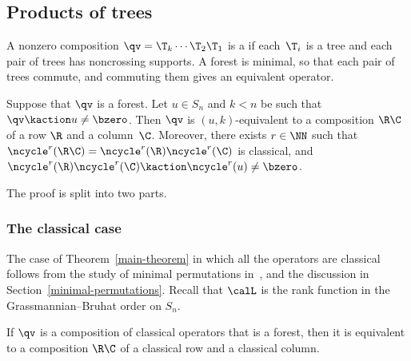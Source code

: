 \subsection{Products of trees}
\label{SS:trees}
A nonzero composition $\qv=\T_k \cdots \T_2 \T_1$ is a  if each~$\T_i$ is a tree and each pair
of trees has noncrossing supports.
A forest is minimal, so that each pair of trees commute, and commuting them gives an equivalent operator.

\begin{theorem}
    \label{main-theorem}
    Suppose that $\qv$ is a forest.
    Let $u\in S_n$ and $k<n$ be such that $\qv\kaction u\neq\bzero$.
    Then $\qv$ is $(u,k)$-equivalent to a composition $\R\C$ of a row $\R$ and a column~$\C$.
    Moreover, there exists $r \in \NN$ such that $\ncycle^r(\R\C)=\ncycle^r(\R)\ncycle^r(\C)$ is classical,
    and $\ncycle^r(\R)\ncycle^r(\C)\kaction \ncycle^r(u)\neq\bzero$.
 \end{theorem}

The proof is split into two parts.

\subsubsection{The classical case}

The case of Theorem~\ref{main-theorem} in which all the operators are
classical follows from the study of minimal permutations in~\cite[Sect.~6.2]{BS-iso}, and the discussion in
Section~\ref{minimal-permutations}.
Recall that $\calL$ is the rank function in the Grassmannian--Bruhat order on $S_n$.

\begin{proposition}
    \label{BS2002}
    If $\qv$ is a composition of classical operators that is a forest, then it is equivalent to a composition $\R\C$ of a 
    classical row and a classical column. 
\end{proposition}

